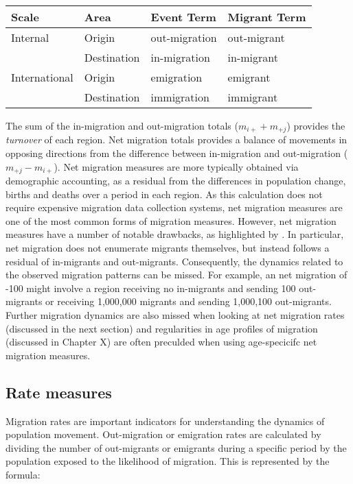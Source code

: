 \documentclass[
]{book}
\begin{document}
\begin{longtable}[]{@{}llll@{}}
\toprule()
Scale & Area & Event Term & Migrant Term \\
\midrule()
\endhead
Internal & Origin & out-migration & out-migrant \\
& Destination & in-migration & in-migrant \\
International & Origin & emigration & emigrant \\
& Destination & immigration & immigrant \\
\bottomrule()
\end{longtable}

The sum of the in-migration and out-migration totals (\(m_{i+} + m_{+j}\)) provides the \emph{turnover} of each region. Net migration totals provides a balance of movements in opposing directions from the difference between in-migration and out-migration (\(m_{+j} - m_{i+}\)). Net migration measures are more typically obtained via demographic accounting, as a residual from the differences in population change, births and deaths over a period in each region. As this calculation does not require expensive migration data collection systems, net migration measures are one of the most common forms of migration measures. However, net migration measures have a number of notable drawbacks, as highlighted by \citet{rogers1990rnm}. In particular, net migration does not enumerate migrants themselves, but instead follows a residual of in-migrants and out-migrants. Consequently, the dynamics related to the observed migration patterns can be missed. For example, an net migration of -100 might involve a region receiving no in-migrants and sending 100 out-migrants or receiving 1,000,000 migrants and sending 1,000,100 out-migrants. Further migration dynamics are also missed when looking at net migration rates (discussed in the next section) and regularities in age profiles of migration (discussed in Chapter X) are often preculded when using age-specicifc net migration measures.

\hypertarget{rate-measures}{%
\subsection{Rate measures}\label{rate-measures}}

Migration rates are important indicators for understanding the dynamics of population movement. Out-migration or emigration rates are calculated by dividing the number of out-migrants or emigrants during a specific period by the population exposed to the likelihood of migration. This is represented by the formula:
\end{document}
